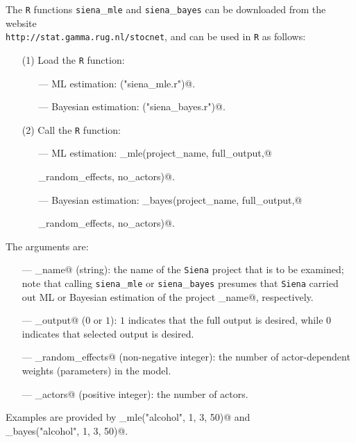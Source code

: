 \documentclass[a4paper,fleqn]{article}
\newcommand{\+}{\, + \,}
\begin{document}
{The {\tt R} functions {\tt siena}\_{\tt mle} and {\tt siena}\_{\tt bayes}
can be downloaded from the website \\
{\tt http://stat.gamma.rug.nl/stocnet},
and can be used in {\tt R} as follows:

\begin{itemize}
\item[(1)] Load the {\tt R} function:
\begin{itemize}
\item[---] ML estimation: \verb@source("siena_mle.r")@.
\item[---] Bayesian estimation: \verb@source("siena_bayes.r")@.
\end{itemize}
\item[(2)] Call the {\tt R} function:
\begin{itemize}
\item[---] ML estimation: \verb@siena_mle(project_name, full_output,@

\verb@no_random_effects, no_actors)@.

\item[---] Bayesian estimation: \verb@siena_bayes(project_name, full_output,@

\verb@no_random_effects, no_actors)@.

\end{itemize}
\end{itemize}

The arguments are:
\begin{itemize}
\item[---] \verb@project_name@ (string): the name of the {\tt Siena} project
that is to be examined;
note that calling {\tt siena}\_{\tt mle} or {\tt siena}\_{\tt bayes} presumes
that {\tt Siena} carried out ML or Bayesian estimation of the
project \verb@project_name@, respectively.
\item[---] \verb@full_output@ ($0$ or $1$): $1$ indicates that the full output is desired,
while $0$ indicates that selected output is desired.
\item[---] \verb@no_random_effects@ (non-negative integer): the number of
actor-dependent weights (parameters) in the model.
\item[---] \verb@no_actors@ (positive integer): the number of actors.
\end{itemize}
Examples are provided by \verb@siena_mle("alcohol", 1, 3, 50)@ and\\
\verb@siena_bayes("alcohol", 1, 3, 50)@.

\begin{screen}
\newpage
\end{screen}
\begin{print}
\end{print}
}
\end{document}
